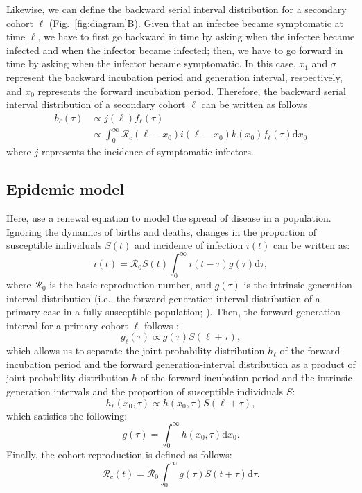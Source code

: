 \documentclass[12pt]{article}
\newcommand{\fref}[1]{Fig.~\ref{fig:#1}}
\begin{document}
Likewise, we can define the backward serial interval distribution for a secondary cohort $\ell$ (\fref{diagram}B).
Given that an infectee became symptomatic at time $\ell$, we have to first go backward in time by asking when the infectee became infected and when the infector became infected; 
then, we have to go forward in time by asking when the infector became symptomatic.
In this case, $x_1$ and $\sigma$ represent the backward incubation period and generation interval, respectively, and $x_0$ represents the forward incubation period.
Therefore, the backward serial interval distribution of a secondary cohort $\ell$ can be written as follows
\begin{equation}
\begin{aligned}
b_\ell(\tau) &\propto j(\ell) f_{\ell}(\tau)\\
&\propto \int_0^\infty \mathcal R_c (\ell - x_0) i(\ell-x_0) k(x_0) f_{\ell}(\tau) \mathrm{d} x_0
\end{aligned}
\end{equation}
where $j$ represents the incidence of symptomatic infectors.

\subsection{Epidemic model}

Here, use a renewal equation to model the spread of disease in a population.
Ignoring the dynamics of births and deaths, changes in the proportion of susceptible individuals $S(t)$ and incidence of infection $i(t)$ can be written as:
\begin{equation}
i(t) = \mathcal R_0 S(t) \int_0^\infty i(t-\tau) g(\tau) \mathrm{d}\tau,
\label{eq:renewal}
\end{equation}
where $\mathcal R_0$ is the basic reproduction number, and $g(\tau)$ is the intrinsic generation-interval distribution (i.e., the forward generation-interval distribution of a primary case in a fully susceptible population; \cite{champredon2015intrinsic}).
Then, the forward generation-interval for a primary cohort $\ell$ follows \citep{champredon2015intrinsic}:
\begin{equation}
g_\ell (\tau) \propto g(\tau) S(\ell + \tau),
\end{equation}
which allows us to separate the joint probability distribution $h_\ell$ of the forward incubation period and the forward generation-interval distribution as a product of joint probability distribution $h$ of the forward incubation period and the intrinsic generation intervals and the proportion of susceptible individuals $S$:
\begin{equation}
h_\ell (x_0, \tau) \propto h(x_0, \tau) S(\ell + \tau),
\end{equation}
which satisfies the following:
\begin{equation}
g(\tau) = \int_0^\infty h(x_0, \tau) \mathrm{d}x_0.
\end{equation}
Finally, the cohort reproduction is defined as follows:
\begin{equation}
\mathcal R_c(t) = \mathcal R_0 \int_0^\infty g(\tau) S(t+\tau) \mathrm{d} \tau.
\end{equation}
\end{document}
